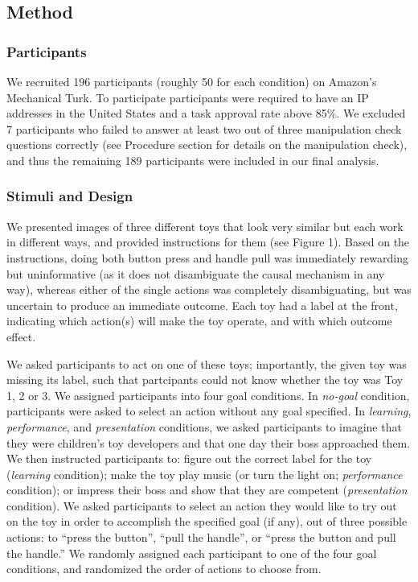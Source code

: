 \documentclass[10pt, letterpaper]{article}
\begin{document}
\subsection{Method}\label{method}

\subsubsection{Participants}\label{participants}

We recruited 196 participants (roughly 50 for each condition) on
Amazon's Mechanical Turk. To participate participants were required to
have an IP addresses in the United States and a task approval rate above
85\%. We excluded 7 participants who failed to answer at least two out
of three manipulation check questions correctly (see Procedure section
for details on the manipulation check), and thus the remaining 189
participants were included in our final analysis.

\subsubsection{Stimuli and Design}\label{stimuli-and-design}

We presented images of three different toys that look very similar but
each work in different ways, and provided instructions for them (see
Figure 1). Based on the instructions, doing both button press and handle
pull was immediately rewarding but uninformative (as it does not
disambiguate the causal mechanism in any way), whereas either of the
single actions was completely disambiguating, but was uncertain to
produce an immediate outcome. Each toy had a label at the front,
indicating which action(s) will make the toy operate, and with which
outcome effect.

We asked participants to act on one of these toys; importantly, the
given toy was missing its label, such that partcipants could not know
whether the toy was Toy 1, 2 or 3. We assigned participants into four
goal conditions. In \emph{no-goal} condition, participants were asked to
select an action without any goal specified. In \emph{learning},
\emph{performance}, and \emph{presentation} conditions, we asked
participants to imagine that they were children's toy developers and
that one day their boss approached them. We then instructed participants
to: figure out the correct label for the toy (\emph{learning}
condition); make the toy play music (or turn the light on;
\emph{performance} condition); or impress their boss and show that they
are competent (\emph{presentation} condition). We asked participants to
select an action they would like to try out on the toy in order to
accomplish the specified goal (if any), out of three possible actions:
to ``press the button'', ``pull the handle'', or ``press the button and
pull the handle.'' We randomly assigned each participant to one of the
four goal conditions, and randomized the order of actions to choose
from.
\end{document}

